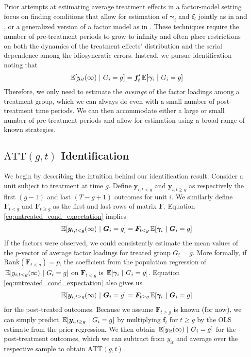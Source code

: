 \documentclass[12pt]{article}
\def\ATT{\text{ATT}}
\begin{document}
Prior attempts at estimating average treatment effects in a factor-model setting focus on finding conditions that allow for estimation of $\bm \gamma_i$ and $\bm f_t$ jointly as in \citet{Gobillon_Magnac_2016} and \citet{Xu_2017}, or a generalized version of a factor model as in \citet{arkhangelsky2021synthetic}. These techniques require the number of pre-treatment periods to grow to infinity and often place restrictions on both the dynamics of the treatment effects' distribution and the serial dependence among the idiosyncratic errors. Instead, we pursue identification noting that 
\begin{equation}\label{eq:untreated_cond_expectation}
\expec{y_{it}(\infty)}{G_i = g} = \bm f_t' \expec{\bm \gamma_i}{G_i = g}
\end{equation}
Therefore, we only need to estimate the \emph{average} of the factor loadings among a treatment group, which we can always do even with a small number of post-treatment time periods. We can then accommodate either a large or small number of pre-treatment periods and allow for estimation using a broad range of known strategies.

\subsection{\texorpdfstring{$\ATT(g,t)$}{ATT(g,t)} Identification}\label{sec:ATT_identification}

We begin by describing the intuition behind our identification result. Consider a unit subject to treatment at time $g$. Define $\bm y_{i,t<g}$ and $\bm y_{i,t\geq g}$ as respectively the first $(g-1)$ and last $(T-g+1)$ outcomes for unit $i$. We similarly define $\bm F_{t < g}$ and $\bm F_{t \geq g}$ as the first and last rows of matrix $\bm F$. Equation \eqref{eq:untreated_cond_expectation} implies
\begin{equation}
  \expec{\bm y_{i,t < g}(\infty)}{ \bm G_i = g} = \bm F_{t < g} \expec{\bm \gamma_i}{\bm G_i = g}
\end{equation}
If the factors were observed, we could consistently estimate the mean values of the $p$-vector of average factor loadings for treated group $G_i = g$. More formally, if $\text{Rank}(\bm F_{t < g}) = p$, the coefficient from the population regression of $\expec{y_{i,t < g}(\infty) }{ G_i = g}$ on $\bm F_{t < g}$ is $\expec{\bm \gamma_i}{G_i = g}$. Equation \eqref{eq:untreated_cond_expectation} also gives us 
\begin{equation}
  \expec{\bm y_{i,t \geq g}(\infty)}{ \bm G_i = g} = \bm F_{t \geq g} \expec{\bm \gamma_i}{\bm G_i = g}
\end{equation}
for the post-treated outcomes. Because we assume $\bm F_{t \geq g}$ is known (for now), we can simply predict $\expec{\bm y_{i,t \geq g}}{G_i = g}$ by multiplying $\bm f_t$ for $t \geq g$ by the OLS estimate from the prior regression. We then obtain $\expec{y_{it}(\infty)}{G_i = g}$ for the post-treatment outcomes, which we can subtract from $y_{i t}$ and average over the respective sample to obtain $\text{ATT}(g,t)$. 
\end{document}
